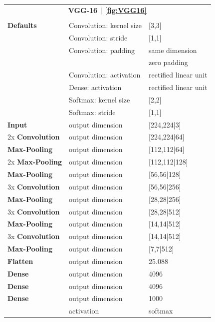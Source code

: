 \begin{tabularx}{\textwidth}{X X X}
	\multicolumn{3}{c}{\textbf{VGG-16 | \ref{fig:VGG16}}}\\
	\\
	\hline
	\endhead
	\textbf{Defaults} & Convolution: kernel size & [3,3]\\
	& Convolution: stride & [1,1]\\
	& Convolution: padding & same dimension\\
	& & zero padding\\
	& Convolution: activation & rectified linear unit\\
	& Dense: activation & rectified linear unit\\
	& Softmax: kernel size & [2,2]\\
	& Softmax: stride & [1,1]\\
	\hline
	\textbf{Input} & output dimension & [224,224|3]\\
	[8pt]
	2x \textbf{Convolution} & output dimension & [224,224|64]\\
	[8pt]
	\textbf{Max-Pooling} & output dimension & [112,112|64]\\
	[8pt]
	2x \textbf{Max-Pooling} & output dimension & [112,112|128]\\
	[8pt]
	\textbf{Max-Pooling} & output dimension & [56,56|128]\\
	[8pt]
	3x \textbf{Convolution} & output dimension & [56,56|256]\\
	[8pt]
	\textbf{Max-Pooling} & output dimension & [28,28|256]\\
	[8pt]
	3x \textbf{Convolution} & output dimension & [28,28|512]\\
	[8pt]
	\textbf{Max-Pooling} & output dimension & [14,14|512]\\
	[8pt]
	3x \textbf{Convolution} & output dimension & [14,14|512]\\
	[8pt]
	\textbf{Max-Pooling} & output dimension & [7,7|512]\\
	[8pt]
	\textbf{Flatten} & output dimension & 25.088\\
	[8pt]
	\textbf{Dense} & output dimension & 4096\\
	[8pt]
	\textbf{Dense} & output dimension & 4096\\
	[8pt]
	\textbf{Dense} & output dimension & 1000\\
	& activation & softmax\\
	\hline
\end{tabularx}


